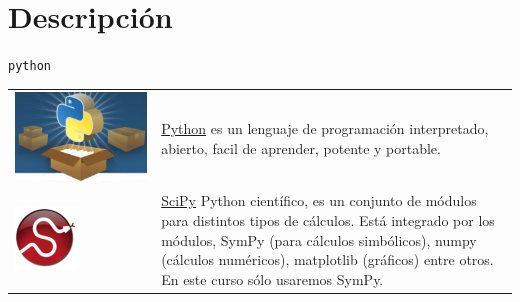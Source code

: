 \documentclass[handout,hyperref={colorlinks=true}]{beamer}
\begin{document}
\section[Descripción]{Descripción}
\begin{frame}{\texttt{python}}
\begin{tabular}{m{.2\linewidth} m{.8\linewidth} }
\includegraphics[scale=.1]{imagenes/python-logo.png} & \href{https://www.python.org/}{Python} es un lenguaje de programación interpretado, abierto, facil de aprender, potente y portable.\\
\includegraphics[scale=1]{imagenes/scipy_logo.png} & \href{http://www.scipy.org/}{SciPy} Python científico, es un conjunto de módulos para distintos tipos de cálculos. Está integrado por los módulos, SymPy (para cálculos simbólicos), numpy (cálculos numéricos), matplotlib (gráficos) entre otros.  En este curso sólo usaremos SymPy.\\
\end{tabular}
\end{frame}
\end{document}
